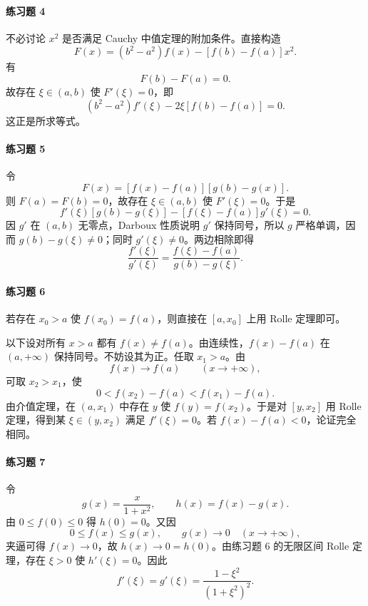 \paragraph{练习题 4}
\begin{xsolution}
不必讨论 $x^2$ 是否满足 Cauchy 中值定理的附加条件。直接构造
\[
  F(x)=(b^2-a^2)f(x)-[f(b)-f(a)]x^2.
\]
有
\[
  F(b)-F(a)=0.
\]
故存在 $\xi\in(a,b)$ 使 $F'(\xi)=0$，即
\[
  (b^2-a^2)f'(\xi)-2\xi[f(b)-f(a)]=0.
\]
这正是所求等式。
\end{xsolution}

\paragraph{练习题 5}
\begin{xsolution}
令
\[
  F(x)=[f(x)-f(a)][g(b)-g(x)].
\]
则 $F(a)=F(b)=0$，故存在 $\xi\in(a,b)$ 使 $F'(\xi)=0$。于是
\[
  f'(\xi)[g(b)-g(\xi)]-[f(\xi)-f(a)]g'(\xi)=0.
\]
因 $g'$ 在 $(a,b)$ 无零点，Darboux 性质说明 $g'$ 保持同号，所以 $g$ 严格单调，因而 $g(b)-g(\xi)\neq0$；同时 $g'(\xi)\neq0$。两边相除即得
\[
  \frac{f'(\xi)}{g'(\xi)}
  =\frac{f(\xi)-f(a)}{g(b)-g(\xi)}.
\]
\end{xsolution}

\paragraph{练习题 6}
\begin{xsolution}
若存在 $x_0>a$ 使 $f(x_0)=f(a)$，则直接在 $[a,x_0]$ 上用 Rolle 定理即可。

以下设对所有 $x>a$ 都有 $f(x)\neq f(a)$。由连续性，$f(x)-f(a)$ 在 $(a,+\infty)$ 保持同号。不妨设其为正。任取 $x_1>a$。由
\[
  f(x)\to f(a)\qquad(x\to+\infty),
\]
可取 $x_2>x_1$，使
\[
  0<f(x_2)-f(a)<f(x_1)-f(a).
\]
由介值定理，在 $(a,x_1)$ 中存在 $y$ 使 $f(y)=f(x_2)$。于是对 $[y,x_2]$ 用 Rolle 定理，得到某 $\xi\in(y,x_2)$ 满足 $f'(\xi)=0$。若 $f(x)-f(a)<0$，论证完全相同。
\end{xsolution}

\paragraph{练习题 7}
\begin{xsolution}
令
\[
  g(x)=\frac{x}{1+x^2},
  \qquad
  h(x)=f(x)-g(x).
\]
由 $0\leqslant f(0)\leqslant0$ 得 $h(0)=0$。又因
\[
  0\leqslant f(x)\leqslant g(x),
  \qquad
  g(x)\to0\quad(x\to+\infty),
\]
夹逼可得 $f(x)\to0$，故 $h(x)\to0=h(0)$。由练习题 6 的无限区间 Rolle 定理，存在 $\xi>0$ 使 $h'(\xi)=0$。因此
\[
  f'(\xi)=g'(\xi)=\frac{1-\xi^2}{(1+\xi^2)^2}.
\]
\end{xsolution}

